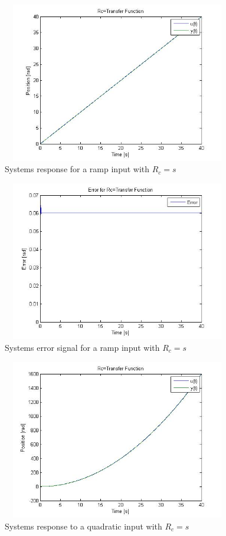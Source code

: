 \documentclass[letterpaper, 11pt, openany]{book}
\begin{document}
\begin{enumerate}
\begin{enumerate}
\begin{figure}[htbp]%
\centering
\includegraphics[width=0.9\textwidth, height = 7cm]{graphics/Ramp3.jpg} 
\caption{Systems response for a ramp input with $R_c = s$}\label{fig:Ramp3}
\end{figure}

\begin{figure}[htbp]%
\centering
\includegraphics[width=0.9\textwidth, height = 7cm]{graphics/Ramp3Err.jpg} 
\caption{Systems error signal for a ramp input with $R_c = s$}\label{fig:Ramp3Err}
\end{figure}

\begin{figure}[htbp]%
\centering
\includegraphics[width=0.9\textwidth, height = 7cm]{graphics/Quad3.jpg} 
\caption{Systems response to a quadratic input with $R_c = s$}\label{fig:Quad3}
\end{figure}


\end{enumerate}
\end{enumerate}
\end{document}
